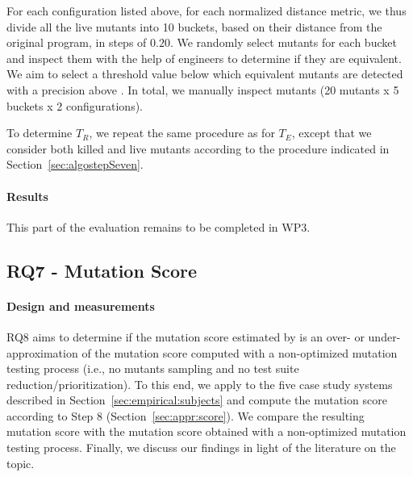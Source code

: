For each configuration listed above, for each normalized distance metric, we thus divide all the live mutants into 10 buckets, based on their distance from the original program, in steps of $0.20$.
We randomly select  mutants for each bucket and inspect them with the help of engineers to determine if they are equivalent. 
We aim to select a threshold value below which equivalent mutants are detected with a precision above . 
In total, we manually inspect  mutants (20 mutants x 5 buckets x 2 configurations).

To determine $T_R$, we repeat the same procedure as for $T_E$, except that we consider both killed and live mutants according to the procedure indicated in Section~\ref{sec:algostepSeven}.

\paragraph{Results}

This part of the evaluation remains to be completed in WP3.
%
%


\subsection{RQ7 - \APPR Mutation Score}

\paragraph{Design and measurements}


RQ8 aims to determine if the mutation score estimated by \APPR is an over- or under- approximation of the mutation score computed with a  non-optimized mutation testing process (i.e., no mutants sampling and no test suite reduction/prioritization). 
To this end, we apply \APPR to the five case study systems described in Section~\ref{sec:empirical:subjects} and compute the mutation score according to \APPR Step 8 (Section~\ref{sec:appr:score}).
 We compare the resulting mutation score with the mutation score obtained with a non-optimized mutation testing process.
Finally, we discuss our findings in light of the literature on the topic.

